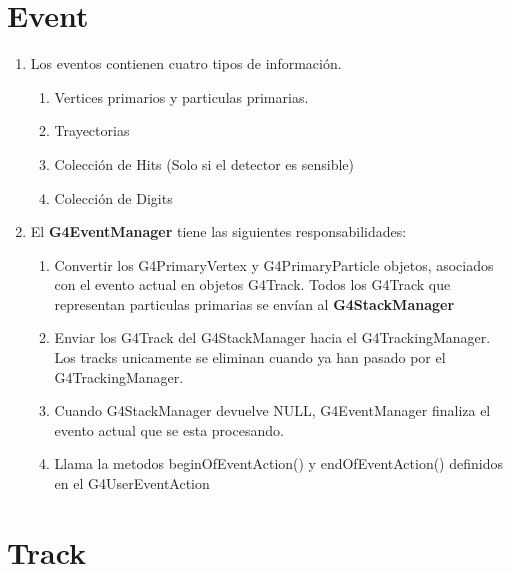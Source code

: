 \documentclass[10pt,a4paper,oneside]{book}
\begin{document}
\section*{Event}
\begin{enumerate}
\item Los eventos contienen cuatro tipos de información.
  \begin{enumerate}
  \item Vertices primarios y particulas primarias.
  \item Trayectorias
  \item Colección de Hits (Solo si el detector es sensible)
  \item Colección de Digits 
  \end{enumerate}
\item El \textbf{G4EventManager} tiene las siguientes responsabilidades:
  \begin{enumerate}
  \item Convertir los G4PrimaryVertex y
    G4PrimaryParticle objetos, asociados con el evento actual en objetos
    G4Track. Todos los G4Track que representan particulas primarias se
    envían al \textbf{G4StackManager}
  \item Enviar los G4Track del G4StackManager hacia el
    G4TrackingManager. Los tracks unicamente se eliminan cuando ya han
    pasado por el G4TrackingManager.
  \item Cuando G4StackManager devuelve NULL, G4EventManager finaliza
    el evento actual que se esta procesando.
  \item Llama la metodos beginOfEventAction() y endOfEventAction()
    definidos en el G4UserEventAction
  \end{enumerate}
\end{enumerate}

\section*{Track}
\end{document}
